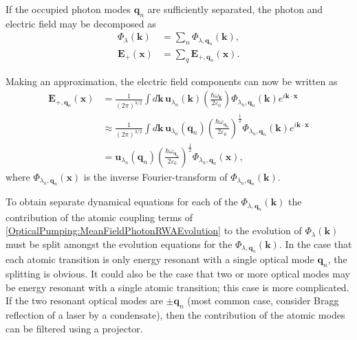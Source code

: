 If the occupied photon modes $\bm{q}_n$ are sufficiently separated, the photon and electric field may be decomposed as
\begin{align}
    \Phi_\lambda(\bm{k}) &= \sum_n \Phi_{\lambda,\bm{q}_n}(\bm{k}), \\
    \bm{E}_+(\bm{x}) &= \sum_q \bm{E}_{+,\bm{q}_n}(\bm{x}).
\end{align}

Making an approximation, the electric field components can now be written as
\begin{align}
    \bm{E}_{+, \bm{q}_n}(\bm{x}) &= \frac{1}{(2\pi)^{3/2}} \int d \bm{k}\, \bm{u}_{\lambda_n} (\bm{k}) \left(\frac{\hbar \omega_{\bm{k}}}{2\varepsilon_0}\right) \Phi_{\lambda_n, \bm{q}_n}(\bm{k}) e^{i \bm{k}\cdot \bm{x}}\\
    &\approx \frac{1}{(2\pi)^{3/2}} \int d \bm{k}\, \bm{u}_{\lambda_n}(\bm{q}_n) \left( \frac{\hbar \omega_{\bm{q}_n}}{2\varepsilon_0}\right)^{\frac{1}{2}} \Phi_{\lambda_n, \bm{q}_n}(\bm{k}) e^{i \bm{k}\cdot \bm{x}}\\
   &= \bm{u}_{\lambda_n}(\bm{q}_n) \left( \frac{\hbar \omega_{\bm{q}_n}}{2\varepsilon_0}\right)^{\frac{1}{2}} \Phi_{\lambda_n, \bm{q}_n} (\bm{x}),
\end{align}
where $\Phi_{\lambda_n, \bm{q}_n}(\bm{x})$ is the inverse Fourier-transform of $\Phi_{\lambda_n, \bm{q}_n}(\bm{k})$.

To obtain separate dynamical equations for each of the $\Phi_{\lambda, \bm{q}_n}(\bm{k})$ the contribution of the atomic coupling terms of \eqref{OpticalPumping:MeanFieldPhotonRWAEvolution} to the evolution of $\Phi_\lambda(\bm{k})$ must be split amongst the evolution equations for the $\Phi_{\lambda, \bm{q}_n}(\bm{k})$.  In the case that each atomic transition is only energy resonant with a single optical mode $\bm{q}_n$, the splitting is obvious.  It could also be the case that two or more optical modes may be energy resonant with a single atomic transition; this case is more complicated.  If the two resonant optical modes are $\pm \bm{q}_n$ (most common case, consider Bragg reflection of a laser by a condensate), then the contribution of the atomic modes can be filtered using a projector.

